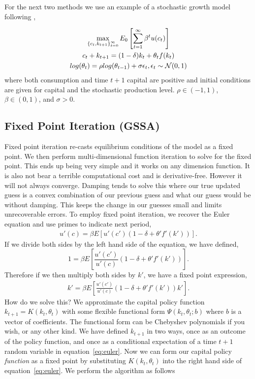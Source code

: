 \documentclass[11pt]{article}%
\begin{document}
For the next two methods we use an example of a stochastic growth model following \citet{Judd2014},

\begin{gather}
	\max_{\left\{c_t,k_{t+1}\right\}_{t=0}^\infty} E_0 \left[ \sum_{t=1}^\infty \beta^t u(c_t) \right] \notag \\
	c_t + k_{t+1} = (1-\delta)k_t + \theta_t f(k_t) \notag \\
	log(\theta_t) = \rho log(\theta_{t-1}) + \sigma \epsilon_t, \epsilon_t \sim \mathcal{N}(0,1)\notag
\end{gather}
where both consumption and time $t+1$ capital are positive and initial conditions are given for capital and the stochastic production level. $\rho \in(-1,1)$, $\beta \in (0,1)$, and $\sigma > 0$.

\subsection{Fixed Point Iteration (GSSA)}
Fixed point iteration re-casts equilibrium conditions of the model as a fixed point. We then perform multi-dimensional function iteration to solve for the fixed point. This ends up being very simple and it works on any dimension function. It is also not bear a terrible computational cost and is derivative-free. However it will not always converge. Damping tends to solve this where our true updated guess is a convex combination of our previous guess and what our guess would be without damping. This keeps the change in our guesses small and limits unrecoverable errors. To employ fixed point iteration, we recover the Euler equation and use primes to indicate next period,
\begin{align}
	u'(c) = \beta E\left[u'(c')\left( 1 - \delta + \theta'f'(k') \right) \right]. \label{eq:euler_orig}
\end{align}
If we divide both sides by the left hand side of the equation, we have defined, $$
1= \beta E\left[ \frac{u'(c')}{u'(c)}\left(1 - \delta + \theta' f'(k') \right) \right].$$
Therefore if we then multiply both sides by $k'$, we have a fixed point expression,
\begin{align}
	k' = \beta E\left[ \frac{u'(c')}{u'(c)}\left(1 - \delta + \theta' f'(k') \right)k' \right]. \label{eq:euler}
\end{align}
How do we solve this? We approximate the capital policy function $k_{t+1} = K(k_t,\theta_t)$ with some flexible functional form $\Psi(k_t,\theta_t;b)$ where $b$ is a vector of coefficients. The functional form can be Chebyshev polynomials if you wish, or any other kind. We have defined $k_{t+1}$ in two ways, once as an outcome of the policy function, and once as a conditional expectation of a time $t+1$ random variable in equation~\ref{eq:euler}. Now we can form our capital policy \emph{function} as a fixed point by substituting $K(k_t,\theta_t)$ into the right hand side of equation~\ref{eq:euler}. We perform the algorithm as follows
\end{document}
